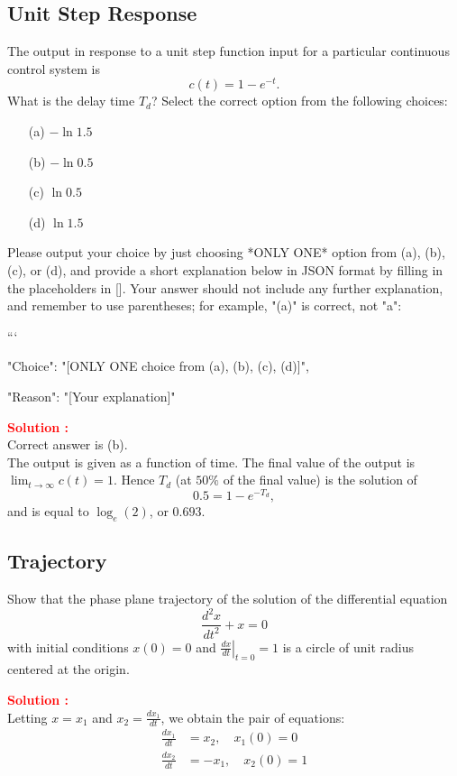 \documentclass[12pt]{article}
\begin{document}
\subsection{Unit Step Response}

The output in response to a unit step function input for a particular continuous control system is 
\[ c(t) = 1 - e^{-t}. \]
What is the delay time \(T_d\)?
Select the correct option from the following choices:
\begin{enumerate}
    \item [(a)] \( -\ln{1.5}\)
    \item [(b)] \( -\ln{0.5}\)
    \item [(c)] \( \ln{0.5}\)
    \item [(d)] \( \ln{1.5}\)
\end{enumerate}

Please output your choice by just choosing *ONLY ONE* option from (a), (b), (c), or (d), and provide a short explanation below in JSON format by filling in the placeholders in []. Your answer should not include any further explanation, and remember to use parentheses; for example, "(a)" is correct, not "a": 

```
{

"Choice": "[ONLY ONE choice from (a), (b), (c), (d)]",

"Reason": "[Your explanation]"

}

\textbf{\textcolor{red}{Solution :}} \\
Correct answer is (b).\\
The output is given as a function of time. The final value of the output is \(\lim_{t \to \infty} c(t) = 1\). Hence \(T_d\) (at \(50\%\) of the final value) is the solution of 
\[ 0.5 = 1 - e^{-T_d}, \] 
and is equal to \(\log_e(2)\), or \(0.693\).\\
\clearpage

\subsection{Trajectory}

Show that the phase plane trajectory of the solution of the differential equation
\[ \frac{d^2x}{dt^2} + x = 0 \]
with initial conditions \(x(0) = 0\) and \(\left.\frac{dx}{dt}\right|_{t=0} = 1\) is a circle of unit radius centered at the origin.

\textbf{\textcolor{red}{Solution :}} \\
Letting \(x = x_1\) and \(x_2 = \frac{dx_1}{dt}\), we obtain the pair of equations:
\begin{align*}
\frac{dx_1}{dt} &= x_2, \quad x_1(0) = 0 \\
\frac{dx_2}{dt} &= -x_1, \quad x_2(0) = 1
\end{align*}
\end{document}
